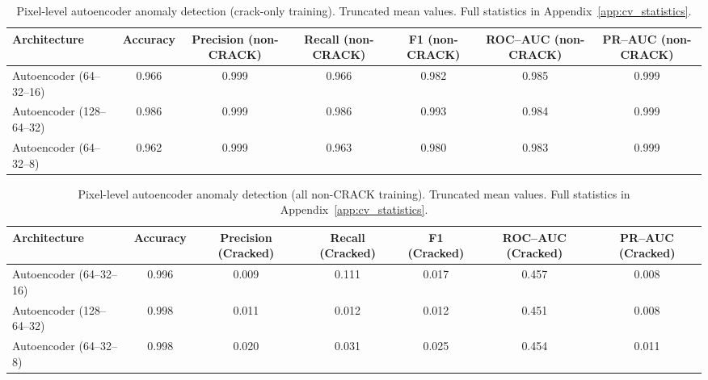 \begin{landscape}
\begin{table}[h!]
    \centering
    \small
    \caption[Autoencoder anomaly detection: crack-only training]{Pixel-level autoencoder anomaly detection (crack-only training). Truncated mean values. Full statistics in Appendix~\ref{app:cv_statistics}.}
    \label{tab:autoencoder_pixel_results_crack_only_multiclass}
    \renewcommand{\arraystretch}{1.15}
    \setlength{\tabcolsep}{4pt}
    \begin{adjustbox}{max width=\linewidth,center}
    \begin{tabular}{@{}lcccccc@{}}
        \toprule
        Architecture & Accuracy & Precision (non-CRACK) & Recall (non-CRACK) & F1 (non-CRACK) & ROC--AUC (non-CRACK) & PR--AUC (non-CRACK) \\
        \midrule
        Autoencoder (64--32--16) & 0.966 & 0.999 & 0.966 & 0.982 & 0.985 & 0.999 \\
        Autoencoder (128--64--32) & 0.986 & 0.999 & 0.986 & 0.993 & 0.984 & 0.999 \\
        Autoencoder (64--32--8) & 0.962 & 0.999 & 0.963 & 0.980 & 0.983 & 0.999 \\
        \bottomrule
    \end{tabular}
    \end{adjustbox}
\end{table}

\vspace{-6pt}

\begin{table}[h!]
    \centering
    \small
    \caption[Autoencoder anomaly detection: all non-CRACK training]{Pixel-level autoencoder anomaly detection (all non-CRACK training). Truncated mean values. Full statistics in Appendix~\ref{app:cv_statistics}.}
    \label{tab:autoencoder_pixel_results_noncrack_multiclass}
    \renewcommand{\arraystretch}{1.15}
    \setlength{\tabcolsep}{4pt}
    \begin{adjustbox}{max width=\linewidth,center}
    \begin{tabular}{@{}lcccccc@{}}
        \toprule
        Architecture & Accuracy & Precision (Cracked) & Recall (Cracked) & F1 (Cracked) & ROC--AUC (Cracked) & PR--AUC (Cracked) \\
        \midrule
        Autoencoder (64--32--16) & 0.996 & 0.009 & 0.111 & 0.017 & 0.457 & 0.008 \\
        Autoencoder (128--64--32) & 0.998 & 0.011 & 0.012 & 0.012 & 0.451 & 0.008 \\
        Autoencoder (64--32--8) & 0.998 & 0.020 & 0.031 & 0.025 & 0.454 & 0.011 \\
        \bottomrule
    \end{tabular}
    \end{adjustbox}
\end{table}
\end{landscape}

